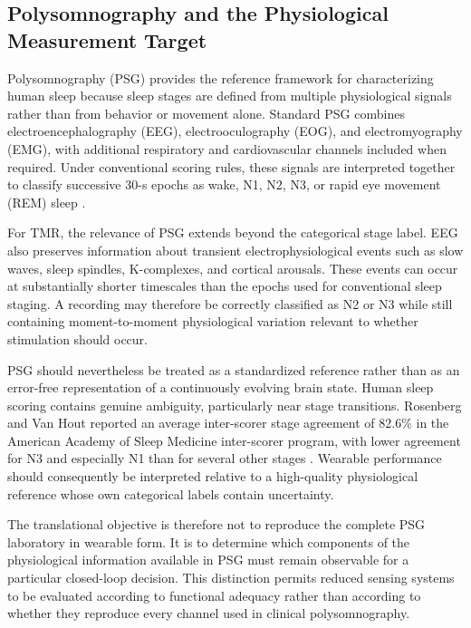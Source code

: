 \subsection{Polysomnography and the Physiological Measurement Target}

Polysomnography (PSG) provides the reference framework for characterizing human
sleep because sleep stages are defined from multiple physiological signals rather
than from behavior or movement alone. Standard PSG combines
electroencephalography (EEG), electrooculography (EOG), and electromyography
(EMG), with additional respiratory and cardiovascular channels included when
required. Under conventional scoring rules, these signals are interpreted
together to classify successive 30-s epochs as wake, N1, N2, N3, or rapid eye
movement (REM) sleep \citep{silber2007scoring}.

For TMR, the relevance of PSG extends beyond the categorical stage label. EEG
also preserves information about transient electrophysiological events such as
slow waves, sleep spindles, K-complexes, and cortical arousals. These events can
occur at substantially shorter timescales than the epochs used for conventional
sleep staging. A recording may therefore be correctly classified as N2 or N3
while still containing moment-to-moment physiological variation relevant to
whether stimulation should occur.

PSG should nevertheless be treated as a standardized reference rather than as
an error-free representation of a continuously evolving brain state. Human sleep
scoring contains genuine ambiguity, particularly near stage transitions.
Rosenberg and Van Hout reported an average inter-scorer stage agreement of
82.6\% in the American Academy of Sleep Medicine inter-scorer program, with
lower agreement for N3 and especially N1 than for several other stages
\citep{rosenberg2013interscorer}. Wearable performance should consequently be
interpreted relative to a high-quality physiological reference whose own
categorical labels contain uncertainty.

The translational objective is therefore not to reproduce the complete PSG
laboratory in wearable form. It is to determine which components of the
physiological information available in PSG must remain observable for a
particular closed-loop decision. This distinction permits reduced sensing
systems to be evaluated according to functional adequacy rather than according
to whether they reproduce every channel used in clinical polysomnography.


